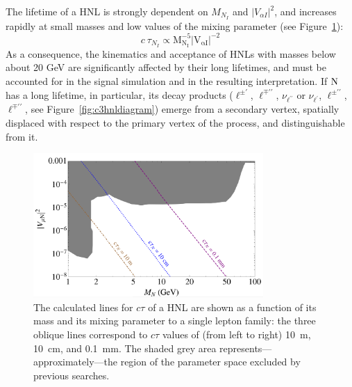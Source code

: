 The lifetime of a HNL is strongly dependent on $M_{N_I}$ and $|V_{\alpha I}|^2$,
and increases rapidly at small masses and low values of the mixing
parameter (see Figure~\ref{fig:hnlLifetime}):
\begin{equation}
\label{eq:lifetimedependences}
c\:\tau_{N_{I}} \propto\mathrm{M_{N_I}^{-5}|V_{\alpha I}|^{-2}}
\end{equation}
As a consequence, the kinematics and acceptance of HNLs with masses
below about 20 GeV are significantly affected by their long lifetimes,
and must be accounted for in the signal simulation and in the resulting
interpretation.
If $\mathrm{N}$ has a long lifetime, in particular, its decay products
($\ell^{\pm\prime}$, $\ell^{\mp\prime\prime}$, $\nu_{\ell^{\prime\prime}}$ or
$\nu_{\ell^{\prime}}$, $\ell^{\pm\prime\prime}$, $\ell^{\mp\prime\prime}$, see Figure~\ref{fig:c3hnldiagram})
emerge from a secondary vertex, spatially displaced with respect to
the primary vertex of the process, and distinguishable from it.
\begin{figure}
\centering
\includegraphics[clip,trim=0.cm 0.1cm 0cm 0cm, width=0.78\textwidth]{Figures/c3/graph_displ.png}
\caption{The calculated lines for $c\tau$ of a HNL are shown as a function of its mass \mhnl
and its mixing parameter \mixpar to a single lepton family:
the three oblique lines correspond to $c\tau$ values of (from left to
right) 10~m,  10~cm, and 0.1~mm.
The shaded grey area represents---approximately---the region of the
parameter space excluded by previous searches.}
\label{fig:hnlLifetime}
\end{figure}


